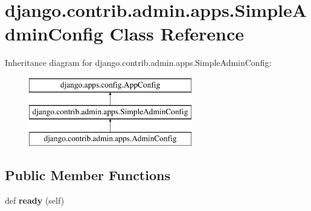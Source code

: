 \hypertarget{classdjango_1_1contrib_1_1admin_1_1apps_1_1_simple_admin_config}{}\section{django.\+contrib.\+admin.\+apps.\+Simple\+Admin\+Config Class Reference}
\label{classdjango_1_1contrib_1_1admin_1_1apps_1_1_simple_admin_config}
Inheritance diagram for django.\+contrib.\+admin.\+apps.\+Simple\+Admin\+Config\+:\begin{figure}[H]
\begin{center}
\leavevmode
\includegraphics[height=3.000000cm]{classdjango_1_1contrib_1_1admin_1_1apps_1_1_simple_admin_config}
\end{center}
\end{figure}
\subsection*{Public Member Functions}
\begin{DoxyCompactItemize}
\item 
\mbox{\label{classdjango_1_1contrib_1_1admin_1_1apps_1_1_simple_admin_config_a4bba8ea233ca7070ef5555491fa3654c}} 
def {\bfseries ready} (self)
\end{DoxyCompactItemize}
